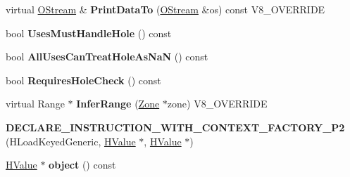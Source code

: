 \begin{DoxyCompactItemize}
\item 
\hypertarget{classv8_1_1internal_1_1_v8___f_i_n_a_l_ac450dad970b14246be761ccf5004924b}{}virtual \hyperlink{classv8_1_1internal_1_1_o_stream}{O\+Stream} \& {\bfseries Print\+Data\+To} (\hyperlink{classv8_1_1internal_1_1_o_stream}{O\+Stream} \&os) const V8\+\_\+\+O\+V\+E\+R\+R\+I\+D\+E\label{classv8_1_1internal_1_1_v8___f_i_n_a_l_ac450dad970b14246be761ccf5004924b}

\item 
\hypertarget{classv8_1_1internal_1_1_v8___f_i_n_a_l_a0faf9d80027eac1e444fcd006b4285df}{}bool {\bfseries Uses\+Must\+Handle\+Hole} () const \label{classv8_1_1internal_1_1_v8___f_i_n_a_l_a0faf9d80027eac1e444fcd006b4285df}

\item 
\hypertarget{classv8_1_1internal_1_1_v8___f_i_n_a_l_a2bc374fbe10f7e55a7f4c4cb09967442}{}bool {\bfseries All\+Uses\+Can\+Treat\+Hole\+As\+Na\+N} () const \label{classv8_1_1internal_1_1_v8___f_i_n_a_l_a2bc374fbe10f7e55a7f4c4cb09967442}

\item 
\hypertarget{classv8_1_1internal_1_1_v8___f_i_n_a_l_a4baa3a2da8e6a98dcd29e67a269e36e3}{}bool {\bfseries Requires\+Hole\+Check} () const \label{classv8_1_1internal_1_1_v8___f_i_n_a_l_a4baa3a2da8e6a98dcd29e67a269e36e3}

\item 
\hypertarget{classv8_1_1internal_1_1_v8___f_i_n_a_l_a7d7c752019e44fc1ba3895619da6a7f5}{}virtual Range $\ast$ {\bfseries Infer\+Range} (\hyperlink{classv8_1_1internal_1_1_zone}{Zone} $\ast$zone) V8\+\_\+\+O\+V\+E\+R\+R\+I\+D\+E\label{classv8_1_1internal_1_1_v8___f_i_n_a_l_a7d7c752019e44fc1ba3895619da6a7f5}

\item 
\hypertarget{classv8_1_1internal_1_1_v8___f_i_n_a_l_a61b51e5f82ab09dd1b39de5487512dba}{}{\bfseries D\+E\+C\+L\+A\+R\+E\+\_\+\+I\+N\+S\+T\+R\+U\+C\+T\+I\+O\+N\+\_\+\+W\+I\+T\+H\+\_\+\+C\+O\+N\+T\+E\+X\+T\+\_\+\+F\+A\+C\+T\+O\+R\+Y\+\_\+\+P2} (H\+Load\+Keyed\+Generic, \hyperlink{classv8_1_1internal_1_1_h_value}{H\+Value} $\ast$, \hyperlink{classv8_1_1internal_1_1_h_value}{H\+Value} $\ast$)\label{classv8_1_1internal_1_1_v8___f_i_n_a_l_a61b51e5f82ab09dd1b39de5487512dba}

\item 
\hypertarget{classv8_1_1internal_1_1_v8___f_i_n_a_l_a5cf72ed4b954f3413a0aa63069a75283}{}\hyperlink{classv8_1_1internal_1_1_h_value}{H\+Value} $\ast$ {\bfseries object} () const \label{classv8_1_1internal_1_1_v8___f_i_n_a_l_a5cf72ed4b954f3413a0aa63069a75283}


\end{DoxyCompactItemize}
